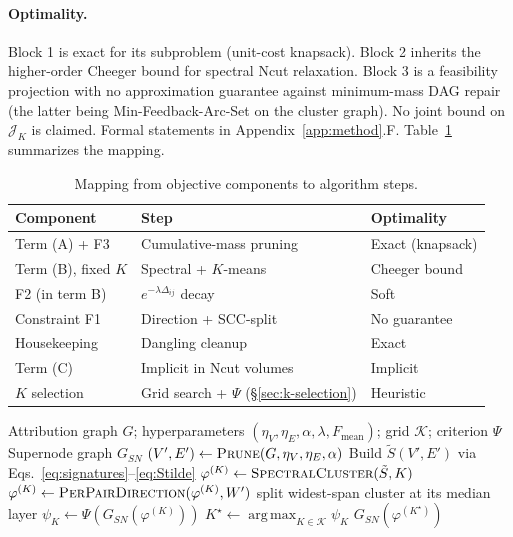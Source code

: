 \documentclass[table, 11pt]{article}
\DeclareMathOperator*{\argmax}{arg\,max}
\begin{document}
\paragraph{Optimality.}
Block 1 is exact for its subproblem (unit-cost knapsack). Block 2
inherits the higher-order Cheeger bound for spectral Ncut
relaxation. Block 3 is a feasibility projection with no
approximation guarantee against minimum-mass DAG repair (the latter
being Min-Feedback-Arc-Set on the cluster graph). No joint bound
on $\mathcal{J}_K$ is claimed. Formal statements in
Appendix~\ref{app:method}.F. Table~\ref{tab:obj-algo} summarizes
the mapping.

\begin{table}[t]
\centering
\caption{Mapping from objective components to algorithm steps.}
\label{tab:obj-algo}
\footnotesize
\begin{tabular}{@{}lll@{}}
\toprule
\textbf{Component} & \textbf{Step} & \textbf{Optimality}\\
\midrule
Term (A) + F3       & Cumulative-mass pruning & Exact (knapsack) \\
Term (B), fixed $K$ & Spectral + $K$-means    & Cheeger bound \\
F2 (in term B)      & $e^{-\lambda \Delta_{ij}}$ decay & Soft \\
Constraint F1       & Direction + SCC-split   & No guarantee \\
Housekeeping        & Dangling cleanup        & Exact \\
Term (C)            & Implicit in Ncut volumes & Implicit \\
$K$ selection       & Grid search + $\Psi$ (\S\ref{sec:k-selection}) & Heuristic \\
\bottomrule
\end{tabular}
\end{table}

\begin{algorithm}[h]
\caption{Block-coordinate strategy on $\mathcal{J}_K$}
\label{alg:asg}
\begin{algorithmic}[1]
\REQUIRE Attribution graph $G$;
hyperparameters $(\eta_V, \eta_E, \alpha, \lambda, F_{\text{mean}})$;
grid $\mathcal{K}$; criterion $\Psi$
\ENSURE Supernode graph $G_{SN}$
\STATE $(V', E') \gets \textsc{Prune}(G, \eta_V, \eta_E, \alpha)$
\STATE Build $\tilde S(V', E')$ via
       Eqs.~\eqref{eq:signatures}--\eqref{eq:Stilde}
  \STATE $\varphi^{(K)} \gets
         \textsc{SpectralCluster}(\tilde S, K)$
  \STATE $\varphi^{(K)} \gets
         \textsc{PerPairDirection}(\varphi^{(K)}, W')$
    \STATE split widest-span cluster at its median layer
  \ENDWHILE
  \STATE $\psi_K \gets \Psi(G_{SN}(\varphi^{(K)}))$
\ENDFOR
\STATE $K^\star \gets \argmax_{K \in \mathcal{K}} \psi_K$
\RETURN $G_{SN}(\varphi^{(K^\star)})$
\end{algorithmic}
\end{algorithm}
\end{document}
